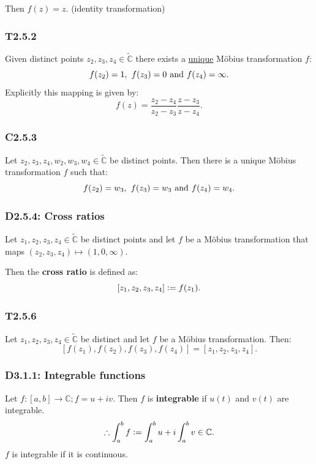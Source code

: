 \documentclass{article}
\newcommand{\deq}{\vcentcolon=}
\begin{document}
\begin{multicols*}{3}
Then $f(z)=z$. (identity transformation)

\subsubsection*{T2.5.2}
Given distinct points $z_2,z_3,z_4\in\widetilde{\mathbb{C}}$
there exists a \underline{unique} M\"obius transformation $f$:
$$f(z_2)=1,\hspace{0.05in} f(z_3)=0
\hspace{0.05in}\text{and}\hspace{0.05in}f(z_4)=\infty.$$
Explicitly this mapping is given by:
$$f(z)=\frac{z_2-z_4}{z_2-z_3}
\frac{z-z_3}{z-z_4}.$$

\subsubsection*{C2.5.3}
Let $z_2,z_3,z_4,w_2,w_3,w_4\in\widetilde{\mathbb{C}}$
be distinct points. Then there is a unique M\"obius
transformation $f$ such that:
$$f(z_2)=w_3,\hspace{0.05in}f(z_3)=w_3
\hspace{0.05in}\text{and}\hspace{0.05in}f(z_4)=w_4.$$

\subsubsection*{D2.5.4: Cross ratios}
Let $z_1,z_2,z_3,z_4\in\widetilde{\mathbb{C}}$ be distinct
points and let $f$ be a M\"obius transformation that maps
$(z_2,z_3,z_4)\mapsto(1,0,\infty)$.

Then the \textbf{cross ratio} is defined as:
$$[z_1,z_2,z_3,z_4]\deq f(z_1).$$

\subsubsection*{T2.5.6}
Let $z_1,z_2,z_3,z_4\in\widetilde{\mathbb{C}}$ be distinct
and let $f$ be a M\"obius transformation. Then:
$$[f(z_1),f(z_2),f(z_3),f(z_4)]=[z_1,z_2,z_3,z_4].$$

\subsubsection*{D3.1.1: Integrable functions}
Let $f:[a,b]\rightarrow\mathbb{C};f=u+iv$. Then $f$ is 
\textbf{integrable} if $u(t)$ and $v(t)$ are integrable.
$$\therefore\int_{a}^{b}f\deq\int_{a}^{b}u+i\int_{a}^{b}v\in\mathbb{C}.$$
$f$ is integrable if it is continuous.


\end{multicols*}
\end{document}
